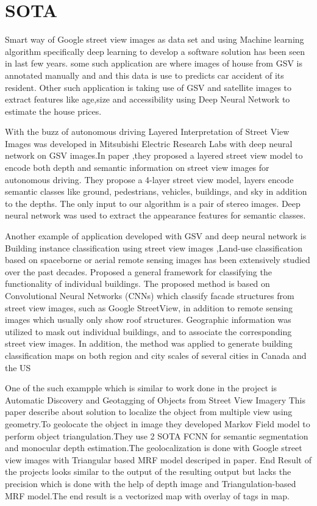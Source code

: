 
\chapter{SOTA}

Smart way of Google street view images\cite{Developers.google.com2018} as data set and using Machine learning algorithm specifically deep learning  to develop a software solution has been seen in last few years. some such application are \cite{Kita-wojciechowska} where images of house from GSV is annotated manually and and this data is use to predicts car accident of its resident. Other such application is taking use of GSV and satellite images to extract features like age,size and accessibility using Deep Neural Network to estimate the house prices.  

With the buzz of autonomous driving Layered Interpretation of Street View Images \cite{bibid} was developed in Mitsubishi Electric Research Labs with deep neural network on GSV images.In paper ,they proposed a layered street view model to encode both depth and semantic information on street view images for autonomous driving. They propose a 4-layer street view model, layers encode semantic classes like ground, pedestrians, vehicles, buildings, and sky in addition to the depths. The only input to our algorithm is a pair of stereo images. Deep neural network was used to extract the appearance features for semantic classes.

Another example of application developed with GSV and deep neural network is Building instance classification using street view images\cite{Kang2018} ,Land-use classification based on spaceborne or aerial remote sensing images has been extensively studied over the past decades. Proposed a general framework for classifying the functionality of individual buildings. The proposed method is based on Convolutional Neural Networks (CNNs) which classify facade structures from street view images, such as Google StreetView\cite{}, in addition to remote sensing images which usually only show roof structures. Geographic information was utilized to mask out individual buildings, and to associate the corresponding street view images. In addition, the method was applied to generate building classification maps on both region and city scales of several cities in Canada and the US

One of the such exampple which is similar to work done in the project is Automatic Discovery and Geotagging of Objects from Street View Imagery \cite{bibid} This paper describe about solution to localize the object from multiple view using geometry.To geolocate the object in image they developed Markov Field model to perform object triangulation.They use 2 SOTA  FCNN for semantic segmentation and monocular depth estimation.The geolocalization is done with Google street view images with Triangular based MRF model descriped in paper. End Result of the projects looks similar to the output of the resulting output but lacks the precision which is done with the help of depth image and Triangulation-based MRF model.The end result is a vectorized map with overlay of tags in map.

